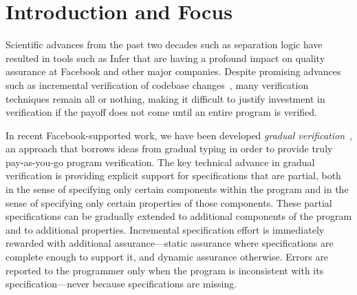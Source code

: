 \documentclass[12pt,twocolumn]{article}
\begin{document}
\begin{sloppypar}

\twocolumn[
\begin{center}
\Large
\textbf{More Gradual Verification}

\vspace{0.5cm}

\normalsize
\textbf{Jonathan Aldrich
(\href{https://dblp.uni-trier.de/pers/hd/a/Aldrich:Jonathan}{DBLP}
/\href{https://scholar.google.com/citations?user=AzHmOtcAAAAJ&hl=en}{GS}),
%
\'Eric Tanter (\href{https://dblp.uni-trier.de/pers/hd/t/Tanter:=Eacute=ric}{DBLP}/\href{https://scholar.google.com/citations?user=d0LISE4AAAAJ}{GS}), 
%
and Joshua Sunshine 
(\href{https://dblp.uni-trier.de/pers/hd/s/Sunshine:Joshua}{DBLP}
/\href{https://scholar.google.com/citations?user=V1texCUAAAAJ&hl=en&oi=ao}{GS})
}

\vspace{0.5cm}

\end{center}]


\section{Introduction and Focus}
\vspace{-2ex}

Scientific advances from the past two decades such as separation logic have resulted in tools such as Infer that are having a profound impact on quality assurance at Facebook and other major companies.  Despite promising advances such as incremental verification of codebase changes~\cite{StartupsScaleups}, many verification techniques remain all or nothing, making it difficult to justify investment in verification if the payoff does not come until an entire program is verified.

In recent Facebook-supported work, we have been developed \textit{gradual verification}~\cite{baderAl:vmcai2018}, an approach that borrows ideas from gradual typing in order to provide truly pay-as-you-go program verification.  The key technical advance in gradual verification is providing explicit support for specifications that are partial, both in the sense of specifying only certain components within the program and in the sense of specifying only certain properties of those components.  These partial specifications can be gradually extended to additional components of the program and to additional properties.  Incremental specification effort is immediately rewarded with additional assurance---static assurance where specifications are complete enough to support it, and dynamic assurance otherwise.  Errors are reported to the programmer only when the program is inconsistent with its specification---never because specifications are missing.


\end{sloppypar}
\end{document}
